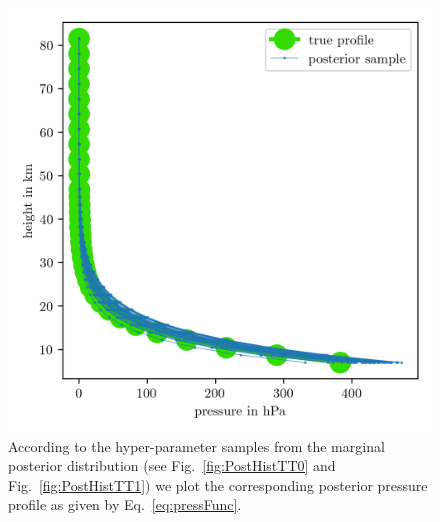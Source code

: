 \begin{figure}[ht!]
	\centering
	\includegraphics{PressPostMeanSigm.png}
	\caption[Pressure posterior samples.]{According to the hyper-parameter samples from the marginal posterior distribution (see Fig.~\ref{fig:PostHistTT0} and Fig.~\ref{fig:PostHistTT1}) we plot the corresponding posterior pressure profile as given by Eq.~\ref{eq:pressFunc}.}
	\label{fig:PressPost}
\end{figure}

